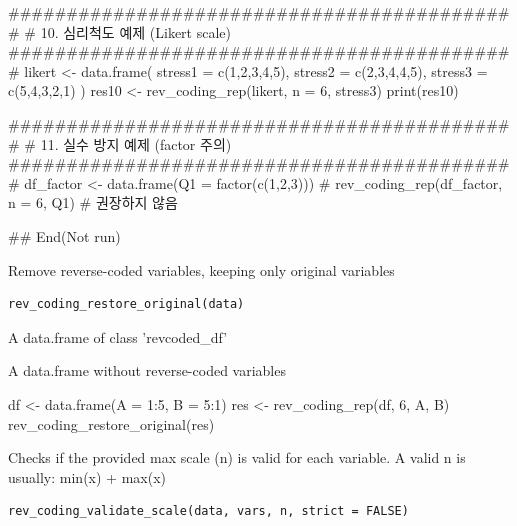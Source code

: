 \documentclass[a4paper]{book}
\begin{document}
\begin{Examples}
\begin{ExampleCode}
############################################
# 10. 심리척도 예제 (Likert scale)
############################################
likert <- data.frame(
  stress1 = c(1,2,3,4,5),
  stress2 = c(2,3,4,4,5),
  stress3 = c(5,4,3,2,1)
)
res10 <- rev_coding_rep(likert, n = 6, stress3)
print(res10)

############################################
# 11. 실수 방지 예제 (factor 주의)
############################################
df_factor <- data.frame(Q1 = factor(c(1,2,3)))
# rev_coding_rep(df_factor, n = 6, Q1)  # 권장하지 않음

## End(Not run)
\end{ExampleCode}
\end{Examples}
%
\begin{Description}
Remove reverse-coded variables, keeping only original variables
\end{Description}
%
\begin{Usage}
\begin{verbatim}
rev_coding_restore_original(data)
\end{verbatim}
\end{Usage}
%
\begin{Arguments}
\begin{ldescription}
\item[\code{data}] A data.frame of class 'revcoded\_df'
\end{ldescription}
\end{Arguments}
%
\begin{Value}
A data.frame without reverse-coded variables
\end{Value}
%
\begin{Examples}
\begin{ExampleCode}
df <- data.frame(A = 1:5, B = 5:1)
res <- rev_coding_rep(df, 6, A, B)
rev_coding_restore_original(res)
\end{ExampleCode}
\end{Examples}
%
\begin{Description}
Checks if the provided max scale (n) is valid for each variable.
A valid n is usually: min(x) + max(x)
\end{Description}
%
\begin{Usage}
\begin{verbatim}
rev_coding_validate_scale(data, vars, n, strict = FALSE)
\end{verbatim}
\end{Usage}
\end{document}

